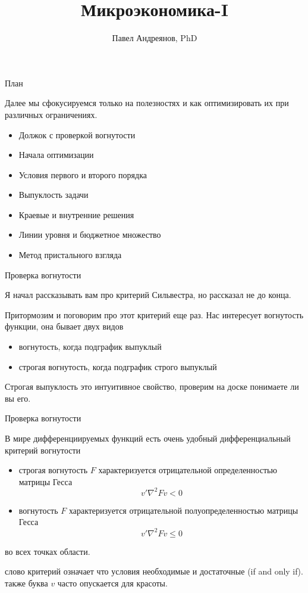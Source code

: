 \documentclass{beamer}
\title{
Микроэкономика-I
}
\author{
Павел Андреянов, PhD
}
\begin{document}
\maketitle

\begin{frame}{План}

Далее мы сфокусируемся только на полезностях и как оптимизировать их при различных ограничениях.

\begin{itemize}
  \item Должок с проверкой вогнутости
  \item Начала оптимизации
  \item Условия первого и второго порядка
  \item Выпуклость задачи
  \item Краевые и внутренние решения
  \item Линии уровня и бюджетное множество
  \item Метод пристального взгляда
\end{itemize}

\end{frame}

\begin{frame}{Проверка вогнутости}

Я начал рассказывать вам про критерий Сильвестра, но рассказал не до конца.

Притормозим и поговорим про этот критерий еще раз. Нас интересует вогнутость функции, она бывает двух видов

\begin{itemize}
\item вогнутость, когда подграфик выпуклый
\item строгая вогнутость, когда подграфик строго выпуклый
\end{itemize}

Строгая выпуклость это интуитивное свойство, проверим на доске понимаете ли вы его.

\end{frame}

\begin{frame}{Проверка вогнутости}

В мире дифференциируемых функций есть очень удобный \alert{дифференциальный критерий} вогнутости

\begin{itemize}
\item строгая вогнутость $F$ характеризуется отрицательной определенностью матрицы Гесса$$v' \nabla^2 F v < 0$$
\item вогнутость $F$ характеризуется отрицательной полуопределенностью матрицы Гесса$$v' \nabla^2 F v \leqslant 0$$
\end{itemize}
во всех точках области.

слово \alert{критерий} означает что условия необходимые и достаточные (if and only if). также буква $v$ часто опускается для красоты.

\end{frame}
\end{document}
